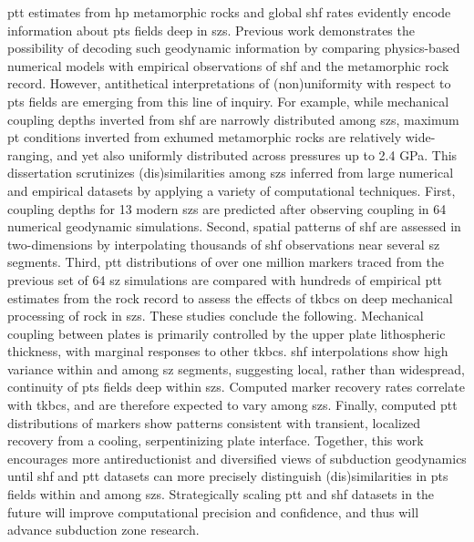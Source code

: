 \Gls{ptt} estimates from \gls{hp} metamorphic rocks and global \gls{shf} rates evidently encode information about \gls{pts} fields deep in \glspl{sz}. Previous work demonstrates the possibility of decoding such geodynamic information by comparing physics-based numerical models with empirical observations of \gls{shf} and the metamorphic rock record. However, antithetical interpretations of (non)uniformity with respect to \gls{pts} fields are emerging from this line of inquiry. For example, while
mechanical coupling depths inverted from \gls{shf} are narrowly distributed among \glspl{sz}, maximum \gls{pt} conditions inverted from exhumed metamorphic rocks are relatively wide-ranging, and yet also uniformly distributed across pressures up to 2.4 GPa. This dissertation scrutinizes (dis)similarities among \glspl{sz} inferred from large numerical and empirical datasets by applying a variety of computational techniques. First, coupling depths for 13 modern \glspl{sz} are predicted after observing coupling in 64 numerical
geodynamic simulations. Second, spatial patterns of \gls{shf} are assessed in two-dimensions by interpolating thousands of \gls{shf} observations near several \gls{sz} segments. Third, \gls{ptt} distributions of over one million markers traced from the previous set of 64 \gls{sz} simulations are compared with hundreds of empirical \gls{ptt} estimates from the rock record to assess the effects of \glspl{tkbc} on deep mechanical processing of rock in \glspl{sz}. These studies conclude the following. Mechanical
coupling between plates is primarily controlled by the upper plate lithospheric thickness, with marginal responses to other \glspl{tkbc}. \Gls{shf} interpolations show high variance within and among \gls{sz} segments, suggesting local, rather than widespread, continuity of \gls{pts} fields deep within \glspl{sz}. Computed marker recovery rates correlate with \glspl{tkbc}, and are therefore expected to vary among \glspl{sz}. Finally, computed \gls{ptt} distributions
of markers show patterns consistent with transient, localized recovery from a cooling, serpentinizing plate interface. Together, this work encourages more antireductionist and diversified views of subduction geodynamics until \gls{shf} and \gls{ptt} datasets can more precisely distinguish (dis)similarities in \gls{pts} fields within and among \glspl{sz}. Strategically scaling \gls{ptt} and \gls{shf} datasets in the future will improve computational precision and confidence, and thus will advance subduction zone research.